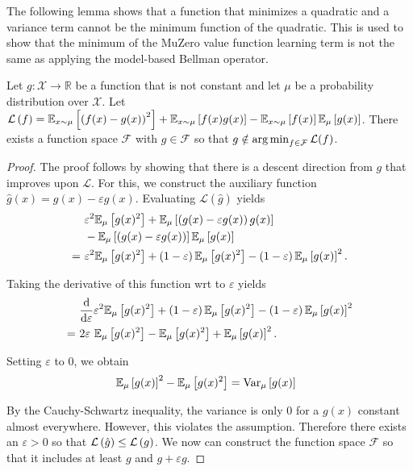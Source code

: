 The following lemma shows that a function that minimizes a quadratic and a variance term cannot be the minimum function of the quadratic. This is used to show that the minimum of the MuZero value function learning term is not the same as applying the model-based Bellman operator.

\begin{lemma}
\label{lemma:cvaml:muzero}
Let $g: \mathcal{X} \rightarrow \mathbb{R}$ be a function that is not constant and let $\mu$ be a probability distribution over $\mathcal{X}$. 
Let $\mathcal{L}\left( f \right) = \mathbb{E}_{x\sim\mu}\left[ \left( f(x) - g(x) \right)^2 \right] + \mathbb{E}_{x\sim\mu}\left[ f(x) g(x) \right] - \mathbb{E}_{x\sim\mu}\left[ f(x) \right]\mathbb{E}_\mu\left[ g(x) \right]$.
There exists a function space $\mathcal{F}$ with $g \in \mathcal{F}$ so that $g \notin \operatorname*{arg\,min}_{f \in \mathcal{F}} \mathcal{L}(f)$.
\end{lemma}

\begin{proof}
The proof follows by showing that there is a descent direction from $g$ that improves upon $\mathcal{L}$. For this, we construct the auxiliary function $\hat{g}(x) = g(x) - \varepsilon g(x)$.
Evaluating $\mathcal{L}(\hat{g})$  yields 
\begin{align}
     &~\varepsilon^2 \mathbb{E}_\mu\left[ g(x)^2 \right] + \mathbb{E}_\mu\left[ \left( g(x) - \varepsilon g(x) \right) g(x) \right] \\
     &~- \mathbb{E}_\mu\left[ \left( g(x) - \varepsilon g(x) \right) \right]\mathbb{E}_\mu\left[ g(x) \right]\\
     =&~\varepsilon^2 \mathbb{E}_\mu\left[ g(x)^2 \right] + \left( 1-\varepsilon \right)\mathbb{E}_\mu\left[ g(x)^2 \right] - \left( 1 - \varepsilon \right) \mathbb{E}_\mu\left[ g(x) \right]^2.
\end{align}

Taking the derivative of this function wrt to $\varepsilon$ yields
\begin{align}
     &~\frac{\mathrm{d}}{\mathrm{d} \varepsilon}\varepsilon^2 \mathbb{E}_\mu\left[ g(x)^2 \right] + \left( 1-\varepsilon \right)\mathbb{E}_\mu\left[ g(x)^2 \right] - \left( 1 - \varepsilon \right) \mathbb{E}_\mu\left[ g(x) \right]^2\\
     =&~2\varepsilon~\mathbb{E}_\mu\left[ g(x)^2 \right] -\mathbb{E}_\mu\left[ g(x)^2 \right] + \mathbb{E}_\mu\left[ g(x) \right]^2.
\end{align}

Setting $\varepsilon$ to 0, we obtain
\begin{align}
     &~\mathbb{E}_\mu\left[ g(x) \right]^2 - \mathbb{E}_\mu\left[ g(x)^2 \right] = \text{Var}_\mu\left[ g(x) \right]
\end{align}

By the Cauchy-Schwartz inequality, the variance is only $0$ for a $g(x)$ constant almost everywhere. However, this violates the assumption.
Therefore there exists an $\varepsilon > 0$ so that $\mathcal{L}\left( \hat{g} \right) \leq \mathcal{L}\left( g \right)$.
We now can construct the function space $\mathcal{F}$ so that it includes at least $g$ and $g + \varepsilon g.$

\end{proof}

